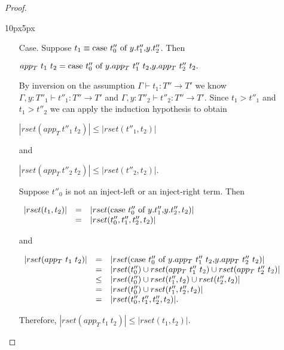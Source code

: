 \begin{proof}
\begin{changemargin}{10px}{5px}
\begin{itemize}
\begin{itemize}
  \item[Case.] Suppose $t_1 \equiv \mbox{case}\ t''_0\ \text{of}\ y\text{.}t''_1\text{,}y\text{.}t''_2$.  Then 
    \begin{center}
      \begin{math}
        app_T\ t_1\ t_2 = \mbox{case}\ t''_0\ \text{of}\ y\text{.}app_T\ t''_1\ t_2\text{,}y\text{.}app_T\ t''_2\ t_2.
      \end{math}
    \end{center}
    By inversion on the assumption $\Gamma \vdash t_1:T'' \to T'$ we know 
    $\Gamma,y:T''_1 \vdash t''_1:T'' \to T'$ and $\Gamma,y:T''_2 \vdash t''_2:T'' \to T'$.
    Since $t_1 > t''_1$ and $t_1 > t''_2$ we can apply the induction hypothesis to obtain
    \begin{center}
      \begin{math}
        |rset(app_T\ t''_1\ t_2)| \leq |rset(t''_1,t_2)|
      \end{math}
    \end{center}
    and
    \begin{center}
      \begin{math}
        |rset(app_T\ t''_2\ t_2)| \leq |rset(t''_2,t_2)|.
      \end{math}
    \end{center}
    Suppose $t''_0$ is not an inject-left or an inject-right term.  Then
    \begin{center}
      \begin{math}
        \begin{array}{lll}
          |rset(t_1,t_2)| & = & |rset(\mbox{case}\ t''_0\ \text{of}\ y\text{.}t''_1\text{,}y\text{.}t''_2, t_2)|\\
          & = & |rset(t''_0,t''_1,t''_2,t_2)|
        \end{array}
      \end{math}
    \end{center}
    and
    \begin{center}
      \begin{math}
        \begin{array}{lll}
          |rset(app_T\ t_1\ t_2)| & = & |rset(\mbox{case}\ t''_0\ \text{of}\ y\text{.}app_T\ t''_1\ t_2\text{,}y\text{.}app_T\ t''_2\ t_2)|\\
          & = & |rset(t''_0) \cup rset(app_T\ t''_1\ t_2) \cup rset(app_T\ t''_2\ t_2)|\\
          & \leq & |rset(t''_0) \cup rset(t''_1, t_2) \cup rset(t''_2, t_2)|\\
          & = & |rset(t''_0) \cup rset(t''_1, t''_2, t_2)|\\
          & = & |rset(t''_0, t''_1, t''_2, t_2)|.
        \end{array}
      \end{math}
    \end{center}
    Therefore, $|rset(app_T\ t_1\ t_2)| \leq |rset(t_1,t_2)|$.
    

\end{itemize}
\end{itemize}
\end{changemargin}
\end{proof}
